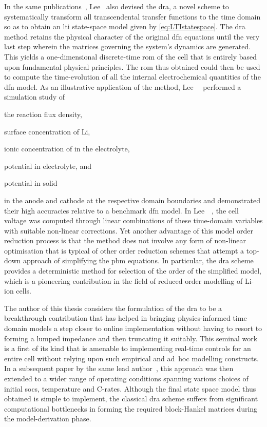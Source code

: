 In the  same publications~\cite{Lee2012a,Lee2012}, Lee~\etal{} also  devised the
\gls{dra},  a  novel  scheme  to  systematically  transform  all  transcendental
transfer functions to  the time domain so as to  obtain an \gls{lti} state-space
model  given  by  \cref{eq:LTIstatespace}.  The  \gls{dra}  method  retains  the
physical character of the original \gls{dfn}  equations until the very last step
wherein the matrices governing the  system's dynamics are generated. This yields
a one-dimensional  discrete-time \gls{rom}  of the cell  that is  entirely based
upon fundamental  physical principles.  The \gls{rom}  thus obtained  could then
be  used to  compute  the  time-evolution of  all  the internal  electrochemical
quantities of the \gls{dfn} model. As an illustrative application of the method,
Lee~\etal~\cite{Lee2012a} performed a simulation study of
\begin{enumerate*}[label=\itshape\alph*\upshape)]
    \item the reaction flux density,
    \item surface concentration of Li,
    \item ionic concentration of  in the electrolyte,
    \item potential in electrolyte, and
    \item potential in solid
\end{enumerate*}
in   the  anode   and  cathode   at   the  respective   domain  boundaries   and
demonstrated  their high  accuracies relative  to a  benchmark \gls{dfn}  model.
In  Lee~\etal~\cite{Lee2012,Lee2012a}, the  cell  voltage  was computed  through
linear  combinations of  these  time-domain variables  with suitable  non-linear
corrections. Yet another advantage of this model order reduction process is that
the method does not involve any  form of non-linear optimisation that is typical
of other order reduction schemes that attempt a top-down approach of simplifying
the \gls{pbm} equations. In  particular, the \gls{dra} scheme provides
a deterministic method for selection of the order of the simplified model, which
is a pioneering  contribution in the field of reduced  order modelling of Li-ion
cells.


The author  of this thesis  considers the formulation of  the \gls{dra} to  be a
breakthrough  contribution that  has  helped in  bringing physics-informed  time
domain models a step closer to online implementation without having to resort to
forming a lumped impedance and then truncating it suitably. This seminal work is
a first  of its  kind that  is amenable to  implementing real-time  controls for
an  entire  cell  without  relying  upon such  empirical  and  \mbox{ad hoc}  modelling
constructs. In a  subsequent paper by the same  lead author~\cite{Lee2014}, this
approach was  then extended to  a wider  range of operating  conditions spanning
various  choices  of  initial  \glspl{soc}, temperature  and  C-rates.  Although
the  final  state  space  model  thus  obtained  is  simple  to  implement,  the
classical \gls{dra} scheme suffers from significant computational bottlenecks in
forming the  required block-Hankel  matrices during the  model-derivation phase.

